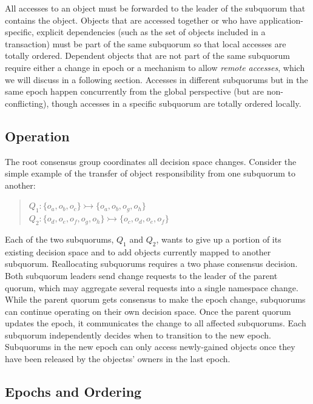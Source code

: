 \documentclass[11pt,letterpaper]{article}
\begin{document}
All accesses to an object must be forwarded to the leader of the subquorum that contains
the object.
Objects that are accessed together or who have application-specific, explicit
dependencies (such as the set of objects included in a transaction) must be part of the
same subquorum so that local accesses are totally ordered.
Dependent objects that are not part of the same subquorum require either a change in
epoch or a mechanism to allow \emph{remote accesses}, which we will discuss in a
following section.
Accesses in different subquorums but in the same epoch happen concurrently
from the global perspective (but are non-conflicting), though accesses in a
specific subquorum are totally ordered locally.

\subsection{Operation}
\vspace{-.5em}

The root consensus group coordinates all decision space changes.
Consider the simple example of the transfer of object responsibility from one subquorum
to another:

\begin{quote}
\small
   $Q_1: \{o_a,o_b,o_c\} \rightarrowtail \{o_a,o_b,o_g,o_h\}$\\
   $Q_2: \{o_d,o_e,o_f,o_g,o_h\} \rightarrowtail \{o_c,o_d,o_e,o_f\}$
\end{quote}

Each of the two subquorums, $Q_1$ and $Q_2$, wants to give up a portion of its
existing decision space and to add objects currently mapped to another subquorum.
Reallocating subquorums requires a two phase consensus decision.
Both subquorum leaders send change requests to the leader of the parent quorum, which may
aggregate several requests into a single namespace change.
While the parent quorum gets consensus to make the epoch change, subquorums can continue
operating on their own decision space.
Once the parent quorum updates the epoch, it communicates the change to all affected
subquorums.
Each subquorum independently decides when to transition to the new epoch.
Subquorums in the new epoch can only access newly-gained objects once they have been
released by the objectss' owners in the last epoch.

\subsection{Epochs and Ordering}
\vspace{-.5em}
\end{document}

